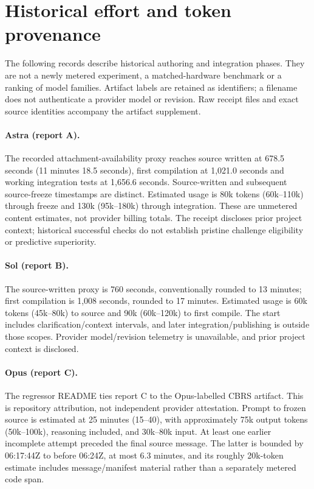\section{Historical effort and token provenance}
\label{app:effort}

The following records describe historical authoring and integration phases.
They are not a newly metered experiment, a matched-hardware benchmark or a
ranking of model families. Artifact labels are retained as identifiers; a
filename does not authenticate a provider model or revision. Raw receipt files
and exact source identities accompany the artifact supplement.

\paragraph{Astra (report A).}
The recorded attachment-availability proxy reaches source written at 678.5
seconds (11 minutes 18.5 seconds), first compilation at 1,021.0 seconds and
working integration tests at 1,656.6 seconds. Source-written and subsequent
source-freeze timestamps are distinct. Estimated usage is 80k tokens
(60k--110k) through freeze and 130k (95k--180k) through integration. These are
unmetered content estimates, not provider billing totals. The receipt discloses
prior project context; historical successful checks do not establish pristine
challenge eligibility or predictive superiority.

\paragraph{Sol (report B).}
The source-written proxy is 760 seconds, conventionally rounded to 13 minutes;
first compilation is 1,008 seconds, rounded to 17 minutes. Estimated usage is
60k tokens (45k--80k) to source and 90k (60k--120k) to first compile. The start
includes clarification/context intervals, and later integration/publishing is
outside those scopes. Provider model/revision telemetry is unavailable, and
prior project context is disclosed.

\paragraph{Opus (report C).}
The regressor README ties report C to the Opus-labelled CBRS artifact. This is
repository attribution, not independent provider attestation. Prompt to frozen
source is estimated at 25 minutes (15--40), with approximately 75k output tokens
(50k--100k), reasoning included, and 30k--80k input. At least one earlier
incomplete attempt preceded the final source message. The latter is bounded by
06:17:44Z to before 06:24Z, at most 6.3 minutes, and its roughly 20k-token estimate
includes message/manifest material rather than a separately metered code span.

